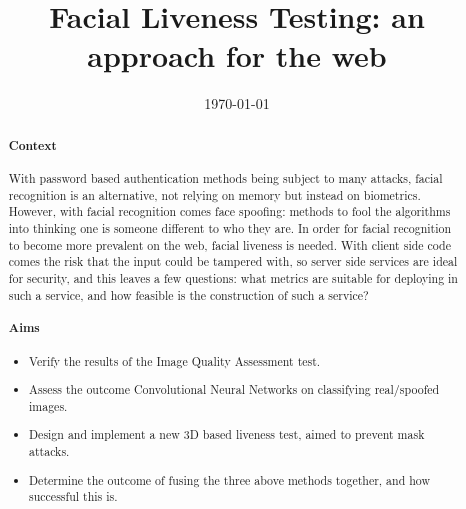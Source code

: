 \documentclass[11pt,a4paper]{article}
\title{Facial Liveness Testing: an approach for the web}
\author{} %
\date{\today}
\begin{document}
\maketitle
\begin{abstract}

\paragraph{Context}
    With password based authentication methods being subject to many attacks, facial recognition is an alternative, not relying on memory but instead
    on biometrics. However, with facial recognition comes face spoofing: methods to fool the algorithms into thinking one is someone different to who they are.
    In order for facial recognition to become more prevalent on the web, facial liveness is needed. With client side code comes the risk that the input could be tampered with,
    so server side services are ideal for security, and this leaves a few questions: what metrics are suitable for deploying in such a service, and how feasible is the construction of such a service?

\paragraph{Aims}

    \begin{itemize}
        \item Verify the results of the Image Quality Assessment test.
        \item Assess the outcome Convolutional Neural Networks on classifying real/spoofed images.
        \item Design and implement a new 3D based liveness test, aimed to prevent mask attacks.
        \item Determine the outcome of fusing the three above methods together, and how successful this is.
    \end{itemize}


\end{abstract}
\end{document}

